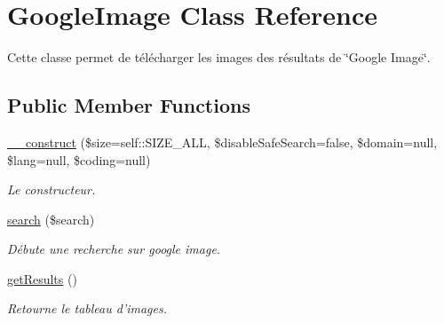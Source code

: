 \hypertarget{class_google_image}{\section{Google\-Image Class Reference}
\label{class_google_image}
}


Cette classe permet de télécharger les images des résultats de \char`\"{}\-Google Image\char`\"{}.  


\subsection*{Public Member Functions}
\begin{DoxyCompactItemize}
\item 
\hyperlink{class_google_image_a5be5a913d3ed0858d381c321b468ed76}{\-\_\-\-\_\-construct} (\$size=self\-::\-S\-I\-Z\-E\-\_\-\-A\-L\-L, \$disable\-Safe\-Search=false, \$domain=null, \$lang=null, \$coding=null)
\begin{DoxyCompactList}\small\item\em Le constructeur. \end{DoxyCompactList}\item 
\hyperlink{class_google_image_a0d624b549023221829714196e71f38da}{search} (\$search)
\begin{DoxyCompactList}\small\item\em Débute une recherche sur google image. \end{DoxyCompactList}\item 
\hyperlink{class_google_image_a3813247f2eae6ac65a8a021daf05bae4}{get\-Results} ()
\begin{DoxyCompactList}\small\item\em Retourne le tableau d'images. \end{DoxyCompactList}\end{DoxyCompactItemize}
